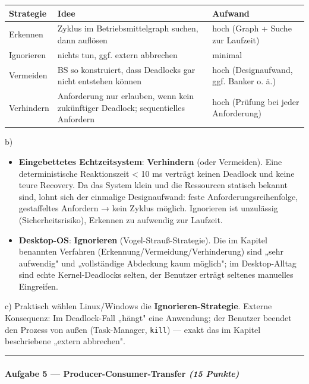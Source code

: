 \documentclass[11pt, a4paper]{article}
\begin{document}
{\small
\begin{tabularx}{\linewidth}{XXX}
\hline
\rowcolor{tableheadbg}
{\color{white}\textbf{Strategie}} & {\color{white}\textbf{Idee}} & {\color{white}\textbf{Aufwand}} \\[2pt]
\hline
\endhead
\hline
\endfoot
Erkennen & Zyklus im Betriebsmittelgraph suchen, dann auflösen & hoch (Graph + Suche zur Laufzeit) \\
Ignorieren & nichts tun, ggf. extern abbrechen & minimal \\
Vermeiden & BS so konstruiert, dass Deadlocks gar nicht entstehen können & hoch (Designaufwand, ggf. Banker o. ä.) \\
Verhindern & Anforderung nur erlauben, wenn kein zukünftiger Deadlock; sequentielles Anfordern & hoch (Prüfung bei jeder Anforderung) \\
\end{tabularx}
}


b)

\begin{itemize}
  \item \textbf{Eingebettetes Echtzeitsystem}: \textbf{Verhindern} (oder Vermeiden). Eine deterministische Reaktionszeit < 10 ms verträgt keinen Deadlock und keine teure Recovery. Da das System klein und die Ressourcen statisch bekannt sind, lohnt sich der einmalige Designaufwand: feste Anforderungsreihenfolge, gestaffeltes Anfordern → kein Zyklus möglich. Ignorieren ist unzulässig (Sicherheitsrisiko), Erkennen zu aufwendig zur Laufzeit.
  \item \textbf{Desktop-OS}: \textbf{Ignorieren} (Vogel-Strauß-Strategie). Die im Kapitel benannten Verfahren (Erkennung/Vermeidung/Verhinderung) sind „sehr aufwendig" und „vollständige Abdeckung kaum möglich"; im Desktop-Alltag sind echte Kernel-Deadlocks selten, der Benutzer erträgt seltenes manuelles Eingreifen.
\end{itemize}

c) Praktisch wählen Linux/Windows die \textbf{Ignorieren-Strategie}. Externe Konsequenz: Im Deadlock-Fall „hängt" eine Anwendung; der Benutzer beendet den Prozess von außen (Task-Manager, \texttt{kill}) — exakt das im Kapitel beschriebene „extern abbrechen".



\noindent\textcolor{rulegray}{\rule{\linewidth}{0.4pt}}


\paragraph{Aufgabe 5 — Producer-Consumer-Transfer \textit{(15 Punkte)}}\mbox{}\\[2pt]
\end{document}
